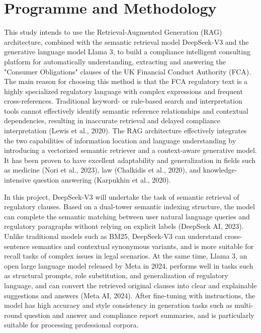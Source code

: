 \documentclass[a4paper,11pt]{article}
\begin{document}
\section{Programme and Methodology}

This study intends to use the Retrieval-Augmented Generation (RAG) architecture, combined with the semantic retrieval model DeepSeek-V3 and the generative language model Llama 3, to build a compliance intelligent consulting platform for automatically understanding, extracting and answering the "Consumer Obligations" clauses of the UK Financial Conduct Authority (FCA). The main reason for choosing this method is that the FCA regulatory text is a highly specialized regulatory language with complex expressions and frequent cross-references. Traditional keyword- or rule-based search and interpretation tools cannot effectively identify semantic reference relationships and contextual dependencies, resulting in inaccurate retrieval and delayed compliance interpretation (Lewis et al., 2020). The RAG architecture effectively integrates the two capabilities of information location and language understanding by introducing a vectorized semantic retriever and a context-aware generative model. It has been proven to have excellent adaptability and generalization in fields such as medicine (Nori et al., 2023), law (Chalkidis et al., 2020), and knowledge-intensive question answering (Karpukhin et al., 2020).

In this project, DeepSeek-V3 will undertake the task of semantic retrieval of regulatory clauses. Based on a dual-tower semantic indexing structure, the model can complete the semantic matching between user natural language queries and regulatory paragraphs without relying on explicit labels (DeepSeek AI, 2023). Unlike traditional models such as BM25, DeepSeek-V3 can understand cross-sentence semantics and contextual synonymous variants, and is more suitable for recall tasks of complex issues in legal scenarios. At the same time, Llama 3, an open large language model released by Meta in 2024, performs well in tasks such as structural prompts, role substitution, and generalization of regulatory language, and can convert the retrieved original clauses into clear and explainable suggestions and answers (Meta AI, 2024). After fine-tuning with instructions, the model has high accuracy and style consistency in generation tasks such as multi-round question and answer and compliance report summaries, and is particularly suitable for processing professional corpora.
\end{document}
